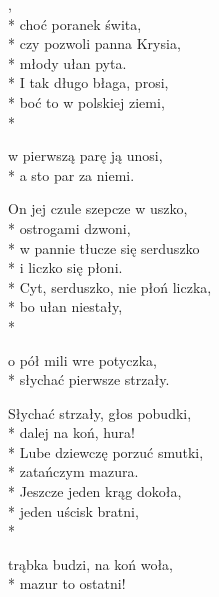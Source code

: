 \begin{lyrics}[longestline={Cyt, serduszko, nie płoń liczka,}]

,\\*
choć poranek świta,\\*
czy pozwoli panna Krysia,\\*
młody ułan pyta.\\*
\medskip
\vin I tak długo błaga, prosi,\\*
\vin boć to w polskiej ziemi,\\*
\begin{markverses}[atwidthof={\vin trąbka budzi, na koń woła}]%
\vin w pierwszą parę ją unosi,\\*
\vin a sto par za niemi.
\end{markverses}

On jej czule szepcze w uszko,\\*
ostrogami dzwoni,\\*
w pannie tłucze się serduszko\\*
i liczko się płoni.\\*
\medskip
\vin Cyt, serduszko, nie płoń liczka,\\*
\vin bo ułan niestały,\\*
\begin{markverses}[atwidthof={\vin trąbka budzi, na koń woła}]%
\vin o pół mili wre potyczka,\\*
\vin słychać pierwsze strzały.
\end{markverses}

Słychać strzały, głos pobudki,\\*
dalej na koń, hura!\\*
Lube dziewczę porzuć smutki,\\*
zatańczym mazura.\\*
\medskip
\vin Jeszcze jeden krąg dokoła,\\*
\vin jeden uścisk bratni,\\*
\begin{markverses}[atwidthof={\vin trąbka budzi, na koń woła}]%
\vin trąbka budzi, na koń woła,\\*
\vin mazur to ostatni!
\end{markverses}
\end{lyrics}


